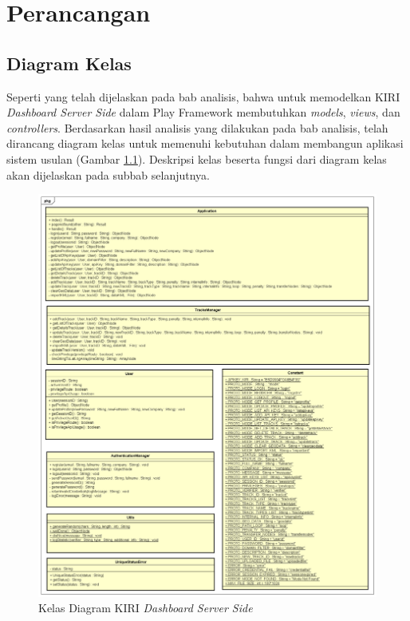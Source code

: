 \chapter{Perancangan}
\label{chap:perancangan}

\section{Diagram Kelas}
\label{sec:diagramkelas}
Seperti yang telah dijelaskan pada bab analisis, bahwa untuk memodelkan KIRI \textit{Dashboard Server Side} dalam Play Framework membutuhkan \textit{models}, \textit{views}, dan \textit{controllers}. Berdasarkan hasil analisis yang dilakukan pada bab analisis, telah dirancang diagram kelas untuk memenuhi kebutuhan dalam membangun aplikasi sistem usulan (Gambar \ref{fig:4_classdiagram}). Deskripsi kelas beserta fungsi dari diagram kelas akan dijelaskan pada subbab selanjutnya.

\begin{figure}[htbp]
	\centering
		\includegraphics[scale=0.45]{Gambar/4_classdiagram.png}
	\caption{Kelas Diagram KIRI \textit{Dashboard Server Side}}
	\label{fig:4_classdiagram}
\end{figure}

